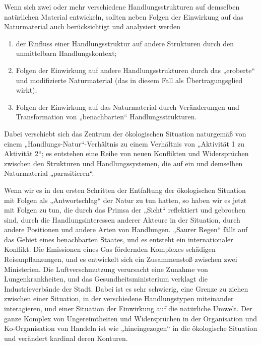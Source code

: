 \documentclass[11pt,a4paper]{article}
\begin{document}
Wenn sich zwei oder mehr verschiedene Handlungsstrukturen auf demselben
natürlichen Material entwickeln, sollten neben Folgen der Einwirkung auf das
Naturmaterial auch berücksich\-tigt und analysiert werden
\begin{enumerate}
\item der Einfluss einer Handlungsstruktur auf andere Strukturen durch den
  unmittelbarn Handlungskontext;
\item Folgen der Einwirkung auf andere Handlungsstrukturen durch das
  „eroberte“ und modifizierte Naturmaterial (das in diesem Fall als
  Übertragungsglied wirkt);
\item Folgen der Einwirkung auf das Naturmaterial durch Veränderungen und
  Transformation von „benachbarten“ Handlungsstrukturen. 
\end{enumerate}
Dabei verschiebt sich das Zentrum der ökologischen Situation naturgemäß von
einem „Hand\-lungs-Natur“-Verhältnis zu einem Verhältnis von „Aktivität 1 zu
Aktivität 2“; es entstehen eine Reihe von neuen Konflikten und Widersprüchen
zwischen den Strukturen und Handlungssystemen, die auf ein und demselben
Naturmaterial „parasitieren“.

Wenn wir es in den ersten Schritten der Entfaltung der ökologischen Situation
mit Folgen als „Antwortschlag“ der Natur zu tun hatten, so haben wir es jetzt
mit Folgen zu tun, die durch das Primsa der „Sicht“ reflektiert und gebrochen
sind, durch die Handlungsinteressen anderer Akteure in der Situation, durch
andere Positionen und andere Arten von Handlungen. „Saurer Regen“ fällt auf
das Gebiet eines benachbarten Staates, und es entsteht ein internationaler
Konflikt. Die Emissionen eines Gas fördernden Komplexes schädigen
Reisanpflanzungen, und es entwickelt sich ein Zusammenstoß zwischen zwei
Ministerien. Die Luftverschmutzung verursacht eine Zunahme von
Lungenkrankheiten, und das Gesundheitsministerium verklagt die
Industrieverbände der Stadt. Dabei ist es sehr schwierig, eine Grenze zu
ziehen zwischen einer Situation, in der verschiedene Handlungstypen
miteinander interagieren, und einer Situation der Einwirkung auf die
natürliche Umwelt.  Der ganze Komplex von Ungereimtheiten und Widersprüchen in
der Organisation und Ko-Organisation von Handeln ist wie „hineingezogen“ in
die ökologische Situation und verändert kardinal deren Konturen.
\end{document}
